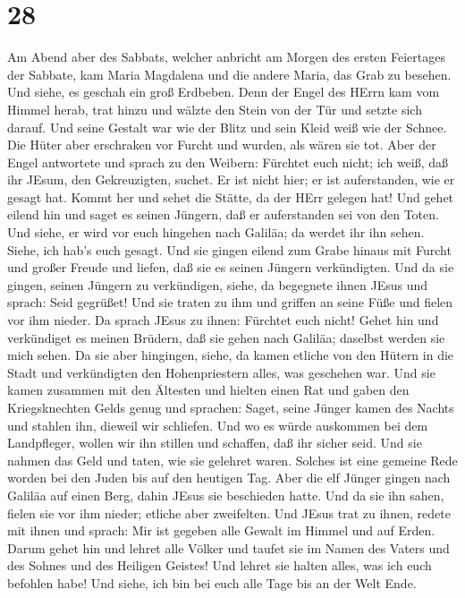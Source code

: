 \hypertarget{section-27}{%
\section{28}\label{section-27}}

 Am Abend aber des Sabbats, welcher anbricht am Morgen des
ersten Feiertages der Sabbate, kam Maria Magdalena und die andere Maria,
das Grab zu besehen.  Und siehe, es geschah ein groß
Erdbeben. Denn der Engel des HErrn kam vom Himmel herab, trat hinzu und
wälzte den Stein von der Tür und setzte sich darauf.  Und
seine Gestalt war wie der Blitz und sein Kleid weiß wie der Schnee.
 Die Hüter aber erschraken vor Furcht und wurden, als wären
sie tot.  Aber der Engel antwortete und sprach zu den
Weibern: Fürchtet euch nicht; ich weiß, daß ihr JEsum, den Gekreuzigten,
suchet.  Er ist nicht hier; er ist auferstanden, wie er
gesagt hat. Kommt her und sehet die Stätte, da der HErr gelegen hat!
 Und gehet eilend hin und saget es seinen Jüngern, daß er
auferstanden sei von den Toten. Und siehe, er wird vor euch hingehen
nach Galiläa; da werdet ihr ihn sehen. Siehe, ich hab's euch gesagt.
 Und sie gingen eilend zum Grabe hinaus mit Furcht und
großer Freude und liefen, daß sie es seinen Jüngern verkündigten. Und da
sie gingen, seinen Jüngern zu verkündigen,  siehe, da
begegnete ihnen JEsus und sprach: Seid gegrüßet! Und sie traten zu ihm
und griffen an seine Füße und fielen vor ihm nieder.  Da
sprach JEsus zu ihnen: Fürchtet euch nicht! Gehet hin und verkündiget es
meinen Brüdern, daß sie gehen nach Galiläa; daselbst werden sie mich
sehen.  Da sie aber hingingen, siehe, da kamen etliche von
den Hütern in die Stadt und verkündigten den Hohenpriestern alles, was
geschehen war.  Und sie kamen zusammen mit den Ältesten und
hielten einen Rat und gaben den Kriegsknechten Gelds genug 
und sprachen: Saget, seine Jünger kamen des Nachts und stahlen ihn,
dieweil wir schliefen.  Und wo es würde auskommen bei dem
Landpfleger, wollen wir ihn stillen und schaffen, daß ihr sicher seid.
 Und sie nahmen das Geld und taten, wie sie gelehret waren.
Solches ist eine gemeine Rede worden bei den Juden bis auf den heutigen
Tag.  Aber die elf Jünger gingen nach Galiläa auf einen
Berg, dahin JEsus sie beschieden hatte.  Und da sie ihn
sahen, fielen sie vor ihm nieder; etliche aber zweifelten. 
Und JEsus trat zu ihnen, redete mit ihnen und sprach: Mir ist gegeben
alle Gewalt im Himmel und auf Erden.  Darum gehet hin und
lehret alle Völker und taufet sie im Namen des Vaters und des Sohnes und
des Heiligen Geistes!  Und lehret sie halten alles, was ich
euch befohlen habe! Und siehe, ich bin bei euch alle Tage bis an der
Welt Ende.
